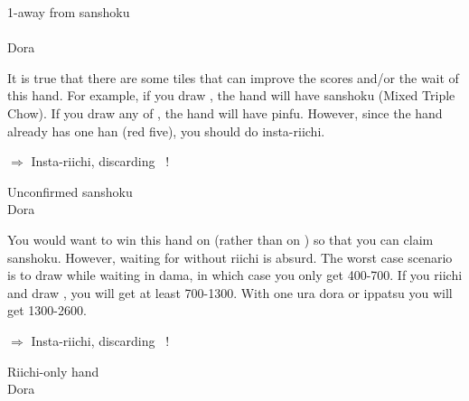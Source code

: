 \begin{itembox}[r]{1-away from {\jap sanshoku}}
\bp
{}\\ \vspace{-16pt}
\rfw{}\bei\bei\dong~~\\
\hfill\footnotesize{{\jap Dora}~~~~~~~}
\ep {}
\vspace{-15pt}
\end{itembox}

\noindent It is true that there are some tiles that can improve the scores and/or the wait of this hand. For example, if you draw {\LARGE{}}, the hand will have {\jap sanshoku} (Mixed Triple Chow). If you draw any of {\LARGE{}}, the hand will have {\jap pinfu}. However, since the hand already has one {\jap han} (red five), you should do insta-riichi. 

\begin{center}
{\Large $\Rightarrow$ Insta-riichi, discarding \dong ~!}
\end{center}

\bigskip
\begin{itembox}[r]{Unconfirmed {\jap sanshoku}}
\bp
{}~~\bei\\
\hfill\footnotesize{{\jap Dora}~~~~~~~}
\ep {}
\vspace{-15pt}
\end{itembox}

\noindent You would want to win this hand on {\LARGE{}} (rather than on {\LARGE{}}) so that you can claim {\jap sanshoku}. However, waiting for {\LARGE{}} without riichi is absurd. The worst case scenario is to draw {\LARGE{}} while waiting in {\jap dama}, in which case you only get 400-700. If you riichi and draw {\LARGE{}}, you will get at least 700-1300. With one {\jap ura dora} or {\jap ippatsu} you will get 1300-2600. 
\begin{center}
{\Large $\Rightarrow$ Insta-riichi, discarding  ~!}
\end{center}

\bigskip
\begin{itembox}[r]{Riichi-only hand}
\bp
{}\bai\bai~~\bei\\
\hfill\footnotesize{{\jap Dora}~~~~~~~}
\ep
\vspace{-15pt}
\end{itembox}

